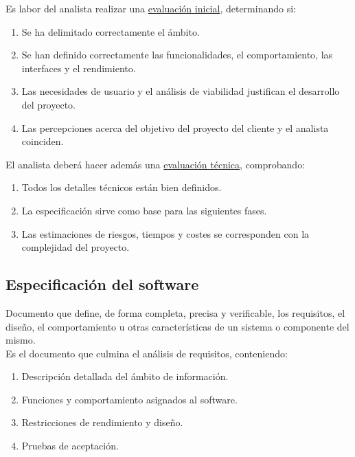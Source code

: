 Es labor del analista realizar una \uline{evaluación inicial}, determinando si:
\begin{enumerate}
     \item Se ha delimitado correctamente el ámbito.
     \item Se han definido correctamente las funcionalidades, el comportamiento, las interfaces y el rendimiento.
     \item Las necesidades de usuario y el análisis de viabilidad justifican el desarrollo del proyecto.
     \item Las percepciones acerca del objetivo del proyecto del cliente y el analista coinciden.
\end{enumerate}
El analista deberá hacer además una \uline{evaluación técnica}, comprobando:
\begin{enumerate}
    \item Todos los detalles técnicos están bien definidos.
    \item La especificación sirve como base para las siguientes fases.
    \item Las estimaciones de riesgos, tiempos y costes se corresponden con la complejidad del proyecto.
\end{enumerate}


\subsection{Especificación del software} 
Documento que define, de forma completa, precisa y verificable, los requisitos, el diseño, el comportamiento u otras características de un sistema o componente del mismo.\\
Es el documento que culmina el análisis de requisitos, conteniendo:
\begin{enumerate}
    \item Descripción detallada del ámbito de información.
    \item Funciones y comportamiento asignados al software.
    \item Restricciones de rendimiento y diseño.
    \item Pruebas de aceptación.
\end{enumerate}



